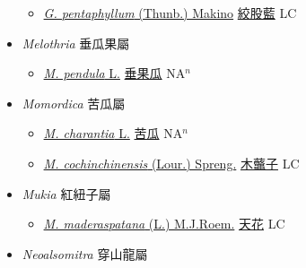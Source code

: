 \begin{itemize}
  \begin{itemize}
        \item[] \href{http://www.theplantlist.org/tpl1.1/search?q=Gynostemma+pentaphyllum}{\textit{G. pentaphyllum} (Thunb.) Makino}   \href{\detokenize{http://taibnet.sinica.edu.tw/chi/taibnet_species_list.php?T2=絞股藍&T2_new_value=true&fr=y}}{絞股藍} LC
  \end{itemize}
 \item[] \textit{Melothria} 垂瓜果屬
                    
  \begin{itemize}
        \item[] \href{http://www.theplantlist.org/tpl1.1/search?q=Melothria+pendula}{\textit{M. pendula} L.}   \href{\detokenize{http://taibnet.sinica.edu.tw/chi/taibnet_species_list.php?T2=垂果瓜&T2_new_value=true&fr=y}}{垂果瓜} NA$^n$
  \end{itemize}
 \item[] \textit{Momordica} 苦瓜屬
                    
  \begin{itemize}
        \item[] \href{http://www.theplantlist.org/tpl1.1/search?q=Momordica+charantia}{\textit{M. charantia} L.}   \href{\detokenize{http://taibnet.sinica.edu.tw/chi/taibnet_species_list.php?T2=苦瓜&T2_new_value=true&fr=y}}{苦瓜} NA$^n$
        \item[] \href{http://www.theplantlist.org/tpl1.1/search?q=Momordica+cochinchinensis}{\textit{M. cochinchinensis} (Lour.) Spreng.}   \href{\detokenize{http://taibnet.sinica.edu.tw/chi/taibnet_species_list.php?T2=木虌子&T2_new_value=true&fr=y}}{木虌子} LC
  \end{itemize}
 \item[] \textit{Mukia} 紅紐子屬
                    
  \begin{itemize}
        \item[] \href{http://www.theplantlist.org/tpl1.1/search?q=Mukia+maderaspatana}{\textit{M. maderaspatana} (L.) M.J.Roem.}   \href{\detokenize{http://taibnet.sinica.edu.tw/chi/taibnet_species_list.php?T2=天花&T2_new_value=true&fr=y}}{天花} LC
  \end{itemize}
 \item[] \textit{Neoalsomitra} 穿山龍屬
                    

\end{itemize}
